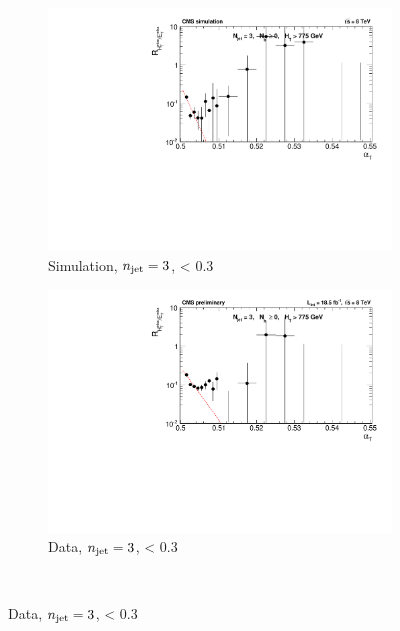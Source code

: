   \begin{figure}[p!]
    \centering
    \begin{subfigure}[b]{0.46\textwidth}
      \includegraphics[width=\textwidth]{Figs/dphi/chris2/qcd_mc/dphi_lt0p3/v2/ratio_eq3j_ge0b_775}
      \caption{Simulation, $n_{\text{jet}} = 3$, \mindphistar < 0.3}
      \label{fig:rdphi_sim_j3_lt0p3}
    \end{subfigure}
    \begin{subfigure}[b]{0.46\textwidth}
      \includegraphics[width=\textwidth]{Figs/dphi/chris2/data/dphi_lt0p3/v2/ratio_eq3j_ge0b_775}
      \caption{Data, $n_{\text{jet}} = 3$, \mindphistar < 0.3}
      \label{fig:rdphi_data_j3_lt0p3}
    \end{subfigure} \\


\end{figure}
